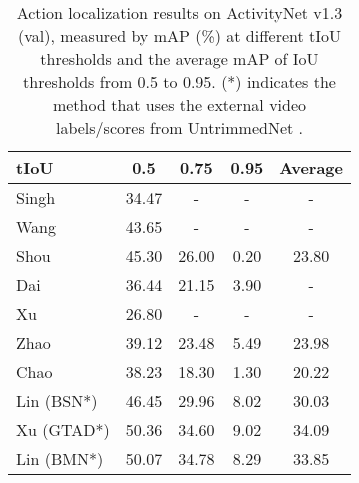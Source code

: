 \documentclass[10pt,journal,compsoc]{IEEEtran}
\begin{document}
		\begin{table}[!t]
		\centering
		\caption{Action localization results on ActivityNet v1.3 (val), measured by mAP (\%) at different tIoU thresholds and the average mAP of IoU thresholds from 0.5 to 0.95. (*) indicates the method that uses the external video labels/scores from UntrimmedNet \cite{wang2017untrimmed}.}
		\begin{tabular}{lccc|c}
			\hline
			tIoU                         & 0.5           & 0.75          & 0.95           & Average              \\ \hline
			Singh \etal  \cite{singh2016untrimmed}        & 34.47        & -             & -               & -                 \\
			Wang \etal   \cite{wang2016uts}        & 43.65        & -             & -               & -                 \\
			Shou \etal \cite{shou2017cdc}         & 45.30             & 26.00             & 0.20          & 23.80                      \\
			Dai \etal \cite{dai2017temporal}        & 36.44             & 21.15             & 3.90             & -                        \\
			Xu \etal \cite{xu2017r}         & 26.80          & -          & -          & -                         \\
			Zhao \etal \cite{zhao2017temporal}        & 39.12 & 23.48          & 5.49           & 23.98                       \\ 
			Chao \etal  \cite{chao2018rethinking}          & 38.23          & 18.30          & 1.30          & 20.22         \\  
			Lin \etal  \cite{lin2018bsn} (BSN*)    & 46.45        & 29.96          & 8.02        & 30.03 \\ 
			Xu \etal \cite{xu2020gtad} (GTAD*)   & 50.36        & 34.60          & 9.02        & 34.09 \\ 
			Lin \etal  \cite{lin2019bmn}  (BMN*)    & 50.07        & 34.78          & 8.29        & 33.85 \\ 
			\hline

\end{tabular}
\end{table}
\end{document}
